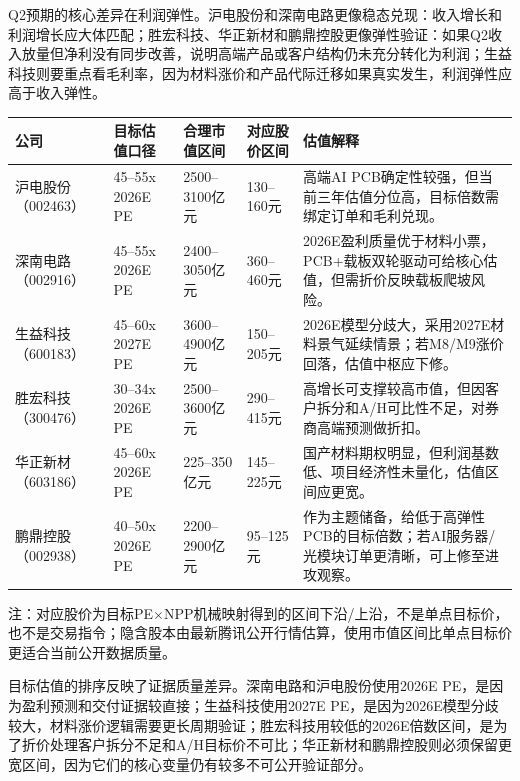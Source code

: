 Q2预期的核心差异在利润弹性。沪电股份和深南电路更像稳态兑现：收入增长和利润增长应大体匹配；胜宏科技、华正新材和鹏鼎控股更像弹性验证：如果Q2收入放量但净利没有同步改善，说明高端产品或客户结构仍未充分转化为利润；生益科技则要重点看毛利率，因为材料涨价和产品代际迁移如果真实发生，利润弹性应高于收入弹性。

\begin{exhibitbox}
\footnotesize
\begin{tabularx}{\textwidth}{L{2.1cm}L{2.0cm}R{2.0cm}R{2.0cm}X}
\toprule
\textbf{公司} & \textbf{目标估值口径} & \textbf{合理市值区间} & \textbf{对应股价区间} & \textbf{估值解释} \\
\midrule
沪电股份（002463） & 45--55x 2026E PE & 2500--3100亿元 & 130--160元 & 高端AI PCB确定性较强，但当前三年估值分位高，目标倍数需绑定订单和毛利兑现。 \\
深南电路（002916） & 45--55x 2026E PE & 2400--3050亿元 & 360--460元 & 2026E盈利质量优于材料小票，PCB+载板双轮驱动可给核心估值，但需折价反映载板爬坡风险。 \\
生益科技（600183） & 45--60x 2027E PE & 3600--4900亿元 & 150--205元 & 2026E模型分歧大，采用2027E材料景气延续情景；若M8/M9涨价回落，估值中枢应下修。 \\
胜宏科技（300476） & 30--34x 2026E PE & 2500--3600亿元 & 290--415元 & 高增长可支撑较高市值，但因客户拆分和A/H可比性不足，对券商高端预测做折扣。 \\
华正新材（603186） & 45--60x 2026E PE & 225--350亿元 & 145--225元 & 国产材料期权明显，但利润基数低、项目经济性未量化，估值区间应更宽。 \\
鹏鼎控股（002938） & 40--50x 2026E PE & 2200--2900亿元 & 95--125元 & 作为主题储备，给低于高弹性PCB的目标倍数；若AI服务器/光模块订单更清晰，可上修至进攻观察。 \\
\bottomrule
\end{tabularx}
\vspace{0.3em}
\scriptsize 注：对应股价为目标PE$\times$NPP机械映射得到的区间下沿/上沿，不是单点目标价，也不是交易指令；隐含股本由最新腾讯公开行情估算，使用市值区间比单点目标价更适合当前公开数据质量。
\end{exhibitbox}

目标估值的排序反映了证据质量差异。深南电路和沪电股份使用2026E PE，是因为盈利预测和交付证据较直接；生益科技使用2027E PE，是因为2026E模型分歧较大，材料涨价逻辑需要更长周期验证；胜宏科技用较低的2026E倍数区间，是为了折价处理客户拆分不足和A/H目标价不可比；华正新材和鹏鼎控股则必须保留更宽区间，因为它们的核心变量仍有较多不可公开验证部分。

